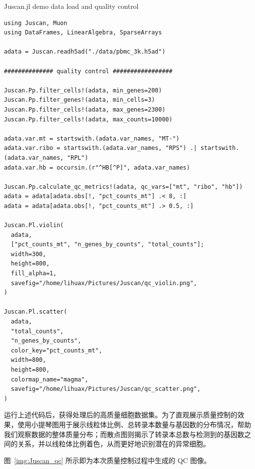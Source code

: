 \begin{fancybox}{Juscan.jl demo data load and quality control}
\begin{lstlisting}
using Juscan, Muon
using DataFrames, LinearAlgebra, SparseArrays

adata = Juscan.readh5ad("./data/pbmc_3k.h5ad")

############## quality control #################

Juscan.Pp.filter_cells!(adata, min_genes=200)
Juscan.Pp.filter_genes!(adata, min_cells=3)
Juscan.Pp.filter_cells!(adata, max_genes=2300)
Juscan.Pp.filter_cells!(adata, max_counts=10000)

adata.var.mt = startswith.(adata.var_names, "MT-")
adata.var.ribo = startswith.(adata.var_names, "RPS") .| startswith.(adata.var_names, "RPL")
adata.var.hb = occursin.(r"^HB[^P]", adata.var_names)

Juscan.Pp.calculate_qc_metrics!(adata, qc_vars=["mt", "ribo", "hb"])
adata = adata[adata.obs[!, "pct_counts_mt"] .< 8, :]
adata = adata[adata.obs[!, "pct_counts_mt"] .> 0.5, :]

Juscan.Pl.violin(
  adata,
  ["pct_counts_mt", "n_genes_by_counts", "total_counts"];
  width=300,
  height=800,
  fill_alpha=1,
  savefig="/home/lihuax/Pictures/Juscan/qc_violin.png",
)

Juscan.Pl.scatter(
  adata,
  "total_counts",
  "n_genes_by_counts",
  color_key="pct_counts_mt",
  width=800,
  height=800,
  colormap_name="magma",
  savefig="/home/lihuax/Pictures/Juscan/qc_scatter.png",
)

\end{lstlisting}
\end{fancybox}

运行上述代码后，获得处理后的高质量细胞数据集。为了直观展示质量控制的效果，使用小提琴图用于展示线粒体比例、总转录本数量与基因数的分布情况，帮助我们观察数据的整体质量分布；而散点图则揭示了转录本总数与检测到的基因数之间的关系，并以线粒体比例着色，从而更好地识别潜在的异常细胞。

图~\ref{img:Juscan_qc} 所示即为本次质量控制过程中生成的 QC 图像。

